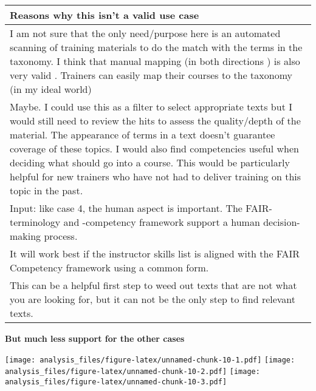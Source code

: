 \documentclass[]{article}
\begin{document}
\begin{table}[H]
\centering
\begin{tabular}{>{\raggedright\arraybackslash\columncolor{khaki}}p{30em}}
\hline
Reasons why this isn't a valid use case\\
\hline
I am not sure that the only need/purpose here is an automated scanning of training materials to do the match with the terms in the taxonomy. I think that manual mapping (in both directions )  is also very valid . Trainers can easily map their courses to the taxonomy (in my ideal world)\\
\hline
Maybe. I could use this as a filter to select appropriate texts but I would still need to review the hits to assess the quality/depth of the material. The appearance of terms in a text doesn't guarantee coverage of these topics. I would also find competencies useful when deciding what should go into a course. This would be particularly helpful for new trainers who have not had to deliver training on this topic in the past.\\
\hline
Input: like case 4, the human aspect is important. The FAIR-terminology and -competency framework support a human decision-making process.\\
\hline
It will work best if the instructor skills list is aligned with the FAIR Competency framework using a common form.\\
\hline
This can be a helpful first step to weed out texts that are not what you are looking for, but it can not be the only step to find relevant texts.\\
\hline
\end{tabular}
\end{table}

\textbf{But much less support for the other cases}

\texttt{[image: analysis\_files/figure-latex/unnamed-chunk-10-1.pdf]}
\texttt{[image: analysis\_files/figure-latex/unnamed-chunk-10-2.pdf]}
\texttt{[image: analysis\_files/figure-latex/unnamed-chunk-10-3.pdf]}
\end{document}
